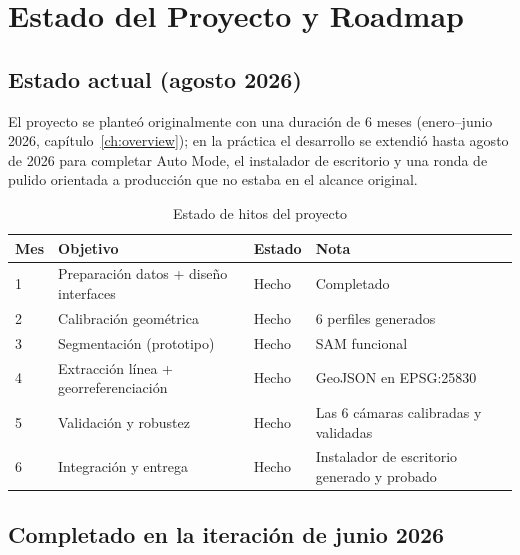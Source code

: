 \chapter{Estado del Proyecto y Roadmap}
\label{ch:roadmap}

\section{Estado actual (agosto 2026)}

El proyecto se planteó originalmente con una duración de 6 meses (enero--junio 2026,
capítulo~\ref{ch:overview}); en la práctica el desarrollo se extendió hasta agosto de 2026 para
completar Auto Mode, el instalador de escritorio y una ronda de pulido orientada a producción
que no estaba en el alcance original.

\begin{table}[H]
\centering
\caption{Estado de hitos del proyecto}
\label{tab:roadmap}
\begin{tabular}{C{1cm} L{5cm} C{1.5cm} L{5cm}}
\toprule
\textbf{Mes} & \textbf{Objetivo} & \textbf{Estado} & \textbf{Nota} \\
 & Preparación datos + diseño interfaces & \textcolor{OliveGreen}{Hecho} & Completado \\
2 & Calibración geométrica                & \textcolor{OliveGreen}{Hecho} & 6 perfiles generados \\
3 & Segmentación (prototipo)              & \textcolor{OliveGreen}{Hecho} & SAM funcional \\
4 & Extracción línea + georreferenciación & \textcolor{OliveGreen}{Hecho} & GeoJSON en EPSG:25830 \\
5 & Validación y robustez                 & \textcolor{OliveGreen}{Hecho} & Las 6 cámaras calibradas y validadas \\
6 & Integración y entrega                 & \textcolor{OliveGreen}{Hecho} & Instalador de escritorio generado y probado \\
\bottomrule
\end{tabular}
\end{table}

\section{Completado en la iteración de junio 2026}

